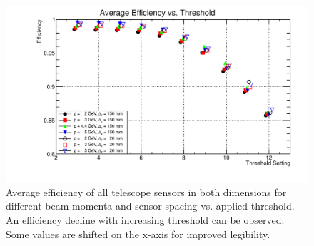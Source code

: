 \begin{figure}[hbtp]
\centering
\includegraphics[width=\textwidth]{figures/effi_thresh.pdf}
\caption[Overall telescope sensor efficiency vs. threshold for different beam
momenta and sensor spacings]{Average efficiency of all telescope sensors in both
dimensions for different beam momenta and sensor spacing vs. applied threshold.
An efficiency decline with increasing threshold can be observed. Some values are
shifted on the x-axis for improved legibility.}
\label{fig:effi_thresh}
\end{figure}

